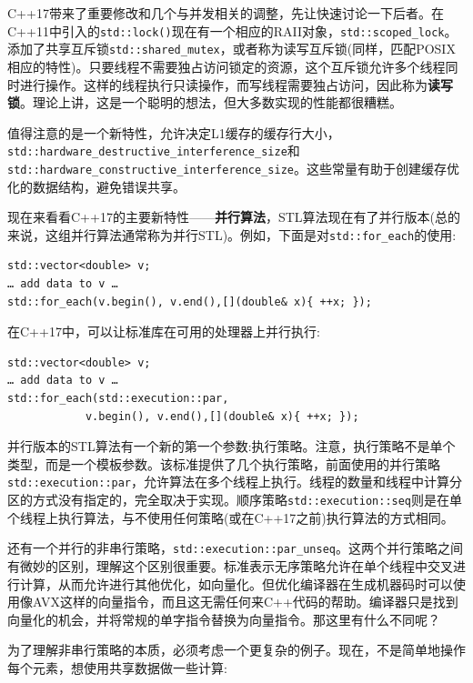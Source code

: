 C++17带来了重要修改和几个与并发相关的调整，先让快速讨论一下后者。在C++11中引入的\texttt{std::lock()}现在有一个相应的RAII对象，\texttt{std::scoped\_lock}。添加了共享互斥锁\texttt{std::shared\_mutex}，或者称为读写互斥锁(同样，匹配POSIX相应的特性)。只要线程不需要独占访问锁定的资源，这个互斥锁允许多个线程同时进行操作。这样的线程执行只读操作，而写线程需要独占访问，因此称为\textbf{读写锁}。理论上讲，这是一个聪明的想法，但大多数实现的性能都很糟糕。

值得注意的是一个新特性，允许决定L1缓存的缓存行大小，\texttt{std::hardware\_destructive\_\linebreak interference\_size}和\texttt{std::hardware\_constructive\_interference\_size}。这些常量有助于创建缓存优化的数据结构，避免错误共享。

现在来看看C++17的主要新特性——\textbf{并行算法}，STL算法现在有了并行版本(总的来说，这组并行算法通常称为并行STL)。例如，下面是对\texttt{std::for\_each}的使用:

\begin{lstlisting}[style=styleCXX]
std::vector<double> v;
… add data to v … 
std::for_each(v.begin(), v.end(),[](double& x){ ++x; });
\end{lstlisting}

在C++17中，可以让标准库在可用的处理器上并行执行:

\begin{lstlisting}[style=styleCXX]
std::vector<double> v;
… add data to v … 
std::for_each(std::execution::par,
			v.begin(), v.end(),[](double& x){ ++x; });
\end{lstlisting}

并行版本的STL算法有一个新的第一个参数:执行策略。注意，执行策略不是单个类型，而是一个模板参数。该标准提供了几个执行策略，前面使用的并行策略\texttt{std::execution::par}，允许算法在多个线程上执行。线程的数量和线程中计算分区的方式没有指定的，完全取决于实现。顺序策略\texttt{std::execution::seq}则是在单个线程上执行算法，与不使用任何策略(或在C++17之前)执行算法的方式相同。

还有一个并行的非串行策略，\texttt{std::execution::par\_unseq}。这两个并行策略之间有微妙的区别，理解这个区别很重要。标准表示无序策略允许在单个线程中交叉进行计算，从而允许进行其他优化，如向量化。但优化编译器在生成机器码时可以使用像AVX这样的向量指令，而且这无需任何来C++代码的帮助。编译器只是找到向量化的机会，并将常规的单字指令替换为向量指令。那这里有什么不同呢？

为了理解非串行策略的本质，必须考虑一个更复杂的例子。现在，不是简单地操作每个元素，想使用共享数据做一些计算:


